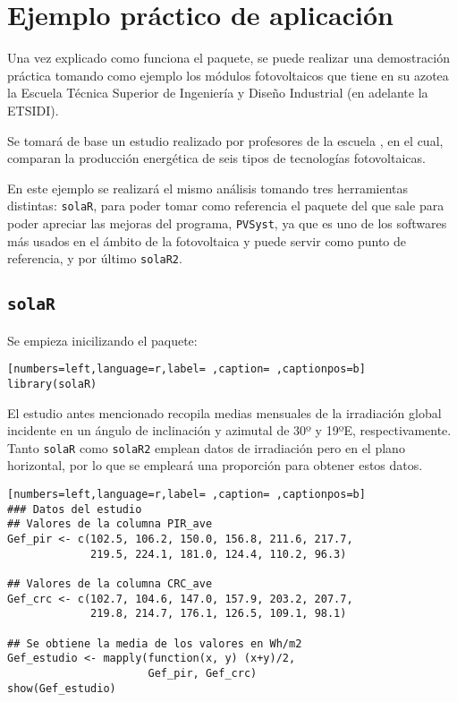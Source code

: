 \chapter{Ejemplo práctico de aplicación}
\label{chap:ejemplo-practico-aplicacion}
Una vez explicado como funciona el paquete, se puede realizar una demostración práctica tomando como ejemplo los módulos fotovoltaicos que tiene en su azotea la Escuela Técnica Superior de Ingeniería y Diseño Industrial (en adelante la ETSIDI).

Se tomará de base un estudio realizado por profesores de la escuela \cite{adrada17}, en el cual, comparan la producción energética de seis tipos de tecnologías fotovoltaicas.

En este ejemplo se realizará el mismo análisis tomando tres herramientas distintas: \texttt{solaR}, para poder tomar como referencia el paquete del que sale para poder apreciar las mejoras del programa, \texttt{PVSyst}, ya que es uno de los softwares más usados en el ámbito de la fotovoltaica y puede servir como punto de referencia, y por último \texttt{solaR2}.

\section{\texttt{solaR}}
\label{sec:org0f6ccb3}
\label{sec:solaR}
Se empieza inicilizando el paquete:
\begin{lstlisting}[numbers=left,language=r,label= ,caption= ,captionpos=b]
library(solaR)
\end{lstlisting}

El estudio antes mencionado recopila medias mensuales de la irradiación global incidente en un ángulo de inclinación y azimutal de 30º y 19ºE, respectivamente. Tanto \texttt{solaR} como \texttt{solaR2} emplean datos de irradiación pero en el plano horizontal, por lo que se empleará una proporción para obtener estos datos.
\begin{lstlisting}[numbers=left,language=r,label= ,caption= ,captionpos=b]
### Datos del estudio
## Valores de la columna PIR_ave
Gef_pir <- c(102.5, 106.2, 150.0, 156.8, 211.6, 217.7,
             219.5, 224.1, 181.0, 124.4, 110.2, 96.3)

## Valores de la columna CRC_ave
Gef_crc <- c(102.7, 104.6, 147.0, 157.9, 203.2, 207.7,
             219.8, 214.7, 176.1, 126.5, 109.1, 98.1)

## Se obtiene la media de los valores en Wh/m2
Gef_estudio <- mapply(function(x, y) (x+y)/2,
                      Gef_pir, Gef_crc)
show(Gef_estudio)
\end{lstlisting}

